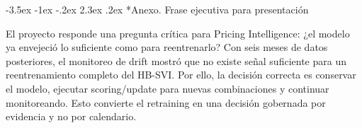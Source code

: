 \documentclass[11pt,letterpaper]{article}
\makeatletter
\renewcommand\section{\@startsection{section}{1}{\z@}
  {-3.5ex \@plus -1ex \@minus -.2ex}
  {2.3ex \@plus .2ex}
  {\Large\bfseries\sffamily\color{azulTec}}}
\makeatother
\begin{document}
\section*{Anexo. Frase ejecutiva para presentación}

El proyecto responde una pregunta crítica para Pricing Intelligence: ¿el modelo ya envejeció lo suficiente como para reentrenarlo? Con seis meses de datos posteriores, el monitoreo de drift mostró que no existe señal suficiente para un reentrenamiento completo del HB-SVI. Por ello, la decisión correcta es conservar el modelo, ejecutar scoring/update para nuevas combinaciones y continuar monitoreando. Esto convierte el retraining en una decisión gobernada por evidencia y no por calendario.
\end{document}

